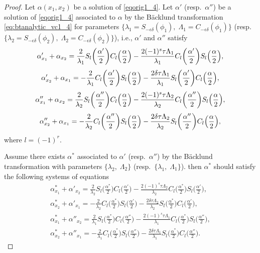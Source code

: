 \documentclass[pdftex]{sigma}
\numberwithin{equation}{section}
\begin{document}
\begin{proof}
Let $\alpha(x_1,x_2)$ be a solution of \eqref{eqorig1_4}. Let $\alpha'$ (resp.\ $\alpha''$) be a solution of \eqref{eqorig1_4} associated to $\alpha$ by the B\"acklund transformation \eqref{eq:btanalytic_vc1_4}
for parameters $\{\lambda_1=S_{-\epsilon\delta}(\phi_1),\; \Lambda_1=C_{-\epsilon\delta}(\phi_1)\}$ (resp.\ $\{\lambda_2=S_{-\epsilon\delta}(\phi_2),\; \Lambda_2=C_{-\epsilon\delta}(\phi_2)\}$), i.e., $\alpha'$ and $\alpha''$ satisfy
\begin{gather}
\alpha'_{x_1}+\alpha_{x_2}=\frac{2}{\lambda_1}S_{l}\biggl(\frac{\alpha'}{2}\biggr)C_{l}\Bigl(\frac{\alpha}{2}\Bigr)-\frac{2(-1)^s\tau\Lambda_1}{\lambda_1} C_{l}\biggl(\frac{\alpha'}{2}\biggr)S_{l}\Bigl(\frac{\alpha}{2}\Bigr),\nonumber\\[1mm]
\alpha'_{x_2}+\alpha_{x_1}=-\frac{2}{\lambda_1}C_{l}\biggl(\frac{\alpha'}{2}\biggr)S_{l}\Bigl(\frac{\alpha}{2}\Bigr)-\frac{2\delta\tau\Lambda_1}{\lambda_1} S_{l}\biggl(\frac{\alpha'}{2}\biggr)C_{l}\Bigl(\frac{\alpha}{2}\Bigr),\label{eq:btanalytic_v1}
\\[1mm]
\alpha''_{x_1}+\alpha_{x_2}=\frac{2}{\lambda_2}S_{l}\biggl(\frac{\alpha''}{2}\biggr)C_{l}\Bigl(\frac{\alpha}{2}\Bigr) -\frac{2(-1)^s\tau\Lambda_2}{\lambda_2}C_{l}\biggl(\frac{\alpha''}{2}\biggr)S_{l}\Bigl(\frac{\alpha}{2}\Bigr),\nonumber\\[1mm]
\alpha''_{x_2}+\alpha_{x_1}=-\frac{2}{\lambda_2}C_{l}\biggl(\frac{\alpha''}
{2 }\biggr)S_{l}\Bigl(\frac{\alpha}{2}\Bigr)-\frac{2\delta\tau\Lambda_2}{\lambda_2} S_{l}\biggl(\frac{\alpha''}{2}\biggr)C_{l}\Bigl(\frac{\alpha}{2}\Bigr),\label{eq:btanalytic_v2}
\end{gather}
 where $ l=(-1)^r$.

Assume there exists $\alpha^*$ associated to $\alpha'$ (resp.\ $\alpha''$) by the B\"acklund transformation with parameters
 $\{\lambda_2,\; \Lambda_2\}$ (resp.\ $\{\lambda_1,\; \Lambda_1\}$). then $\alpha^*$ should satisfy the following systems of equations
\begin{gather}
\alpha^{*}_{x_1}+\alpha'_{x_2} = \frac{2}{\lambda_2}S_{l}\biggl(\frac{\alpha^{*}}{2}\biggr)C_{l}\biggl(\frac{\alpha'}{2}\biggr)-\frac{2(-1)^s\tau\Lambda_2}{\lambda_2} C_{l}\biggl(\frac{\alpha^{*}}{2}\biggr)S_{l}\biggl(\frac{\alpha'}{2}\biggr),\nonumber\\
\alpha^{*}_{x_2}+\alpha'_{x_1}=-\frac{2}{\lambda_2}C_{l}\biggl(\frac{\alpha^{*}}{2}\biggr)S_{l}\biggl(\frac{\alpha'}{2}\biggr)-\frac{2\delta\tau\Lambda_2}{\lambda_2} S_{l}\biggl(\frac{\alpha^{*}}{2}\biggr)C_{l}\biggl(\frac{\alpha'}{2}\biggr),\label{eq:btanalytic_v2*}\\
\alpha^*_{x_1}+\alpha''_{x_2}=\frac{2}{\lambda_1}S_{l}\biggl(\frac{\alpha^*}{2}\biggr)C_{l}\biggl(\frac{\alpha''}{2}\biggr)-\frac{2(-1)^s\tau\Lambda_1}{\lambda_1} C_{l}\biggl(\frac{\alpha^*}{2}\biggr)S_{l}\biggl(\frac{\alpha''}{2}\biggr),\nonumber\\
\alpha^*_{x_2}+\alpha''_{x_1}=-\frac{2}{\lambda_1}C_{l}\biggl(\frac{\alpha^*}{2}\biggr)S_{l}\biggl(\frac{\alpha''}{2}\biggr)-\frac{2\delta\tau\Lambda_1}{\lambda_1} S_{l}\biggl(\frac{\alpha^*}{2}\biggr)C_{l}\biggl(\frac{\alpha''}{2}\biggr).\label{eq:btanalytic_v1*}
\end{gather}


\end{proof}
\end{document}

